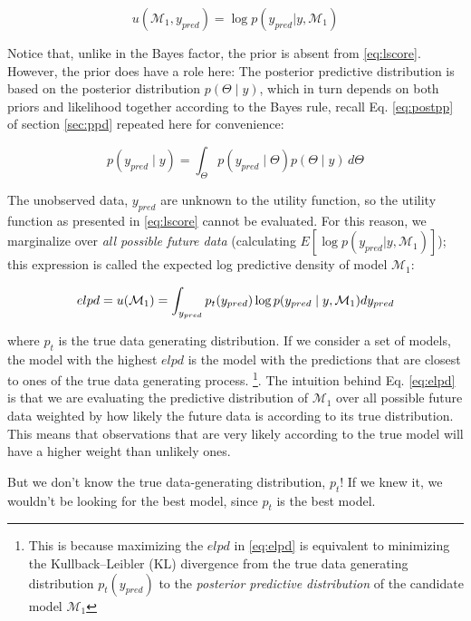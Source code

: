 \documentclass[12pt,]{krantz}
\theoremstyle{definition}
\theoremstyle{definition}
\theoremstyle{definition}
\theoremstyle{remark}
\begin{document}
\begin{equation}
u( \mathcal{M}_1, y_{pred}) = \log p(y_{pred}| y, \mathcal{M}_1)
\label{eq:lscore}
\end{equation}

Notice that, unlike in the Bayes factor, the prior is absent from
\eqref{eq:lscore}. However, the prior does have a role here: The posterior
predictive distribution is based on the posterior distribution
\(p(\Theta\mid y)\), which in turn depends on both priors and likelihood
together according to the Bayes rule, recall Eq. \eqref{eq:postpp} of
section \ref{sec:ppd} repeated here for convenience:

\begin{equation}
p(y_{pred}\mid y )=\int_\Theta p(y_{pred}\mid \Theta) p(\Theta\mid y)\, d\Theta
\label{eq:postpp}
\end{equation}

The unobserved data, \(y_{pred}\) are unknown to the utility function,
so the utility function as presented in \eqref{eq:lscore} cannot be
evaluated. For this reason, we marginalize over \emph{all possible
future data} (calculating \(E[\log p(y_{pred}| y, \mathcal{M}_1)]\));
this expression is called the expected log predictive density of model
\(\mathcal{M}_1\):

\begin{equation}
elpd = u(\mathcal{M}_1) = \int_{y_{pred}} p_t(y_{pred}) \log p(y_{pred} \mid y, \mathcal{M}_1) dy_{pred}\\
\label{eq:elpd}
\end{equation}

where \(p_t\) is the true data generating distribution. If we consider a
set of models, the model with the highest \(elpd\) is the model with the
predictions that are closest to ones of the true data generating
process. \footnote{This is because maximizing the \(elpd\) in
  \eqref{eq:elpd} is equivalent to minimizing the Kullback--Leibler (KL)
  divergence from the true data generating distribution
  \(p_t(y_{pred})\) to the \emph{posterior predictive distribution} of
  the candidate model \(\mathcal{M}_1\)}. The intuition behind Eq.
\eqref{eq:elpd} is that we are evaluating the predictive distribution of
\(\mathcal{M}_1\) over all possible future data weighted by how likely
the future data is according to its true distribution. This means that
observations that are very likely according to the true model will have
a higher weight than unlikely ones.

But we don't know the true data-generating distribution, \(p_t\)! If we
knew it, we wouldn't be looking for the best model, since \(p_t\) is the
best model.
\end{document}
